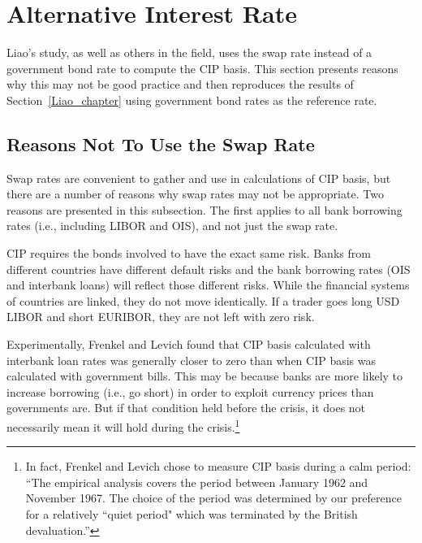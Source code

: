 \section{Alternative Interest Rate} \label{govt_chapter}

Liao's study, as well as others in the field, uses the swap rate instead of a government bond rate to compute the CIP basis.  This section presents reasons why this may not be good practice and then reproduces the results of Section~\ref{Liao_chapter} using government bond rates as the reference rate.

\subsection{Reasons Not To Use the Swap Rate} \label{not_swap_section}


Swap rates are convenient to gather and use in calculations of CIP basis, but there are a number of reasons why swap rates may not be appropriate.  Two reasons are presented in this subsection.  The first applies to all bank borrowing rates (i.e., including LIBOR and OIS), and not just the swap rate.  


CIP requires the bonds involved to have the exact same risk.  Banks from different countries have different default risks and the bank borrowing rates (OIS and interbank loans) will reflect those different risks.  While the financial systems of countries are linked, they do not move identically.  If a trader goes long USD LIBOR and short EURIBOR, they are not left with zero risk. 


Experimentally, Frenkel and Levich\cite{Frenkel1975} found that CIP basis calculated with interbank loan rates was generally closer to zero than when CIP basis was calculated with government bills.  This may be because banks are more likely to increase borrowing (i.e., go short) in order to exploit currency prices than governments are.  But if that condition held before the crisis, it does not necessarily mean it will hold during the crisis.\footnote{In fact, Frenkel and Levich chose to measure CIP basis during a calm period: ``The empirical analysis covers the period between January 1962 and November 1967. The choice of the period was determined by our preference for a relatively ``quiet period" which was terminated by the British devaluation.''\cite{Frenkel1975}}


